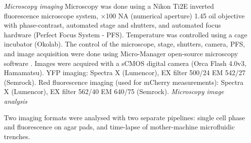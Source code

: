 \documentclass[12pt]{article}
\begin{document}
\vspace{0.5cm}
\newline
\textit{Microscopy imaging}
Microscopy was done using a Nikon Ti2E inverted fluorescence microscope system, ×100 NA (numerical aperture) 1.45 oil objective with phase-contrast, automated stage and shutters, and automated focus hardware (Perfect Focus System - PFS). Temperature was controlled using a cage incubator (Okolab). The control of the microscope, stage, shutters, camera, PFS, and image acquisition were done using Micro-Manager open-source microscopy software . Images were acquired with a sCMOS digital camera (Orca Flash 4.0v3, Hamamatsu). YFP imaging: Spectra X (Lumencor), EX filter 500/24 EM 542/27 (Semrock). Red fluorescence imaging (used for mCherry measurements): Spectra X (Lumencor), EX filter 562/40 EM 640/75 (Semrock).
\vspace{0.5cm}
\newline
\textit{Microscopy image analysis}\par
Two imaging formats were analysed with two separate pipelines: single cell phase and fluorescence on agar pads, and time-lapse of mother-machine microfluidic trenches.
\end{document}
